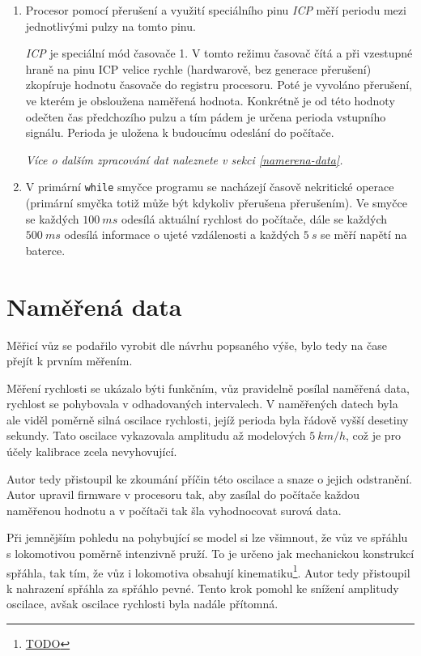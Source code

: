\begin{enumerate}
\item Procesor pomocí přerušení a využití speciálního pinu \textit{ICP}
měří periodu mezi jednotlivými pulzy na tomto pinu.

\textit{ICP} je speciální mód časovače 1. V tomto režimu časovač čítá a při
vzestupné hraně na pinu ICP velice rychle (hardwarově, bez generace přerušení)
zkopíruje hodnotu časovače do registru procesoru. Poté je vyvoláno přerušení,
ve kterém je obsloužena naměřená hodnota. Konkrétně je od této hodnoty odečten
čas předchozího pulzu a tím pádem je určena perioda vstupního signálu. Perioda
je uložena k budoucímu odeslání do počítače.

\textit{Více o dalším zpracování dat naleznete v sekci \ref{namerena-data}.}

\item V primární \texttt{while} smyčce programu se nacházejí časově nekritické
operace (primární smyčka totiž může být kdykoliv přerušena přerušením). Ve
smyčce se každých $100\ ms$ odesílá aktuální rychlost do počítače, dále se každých
$500\ ms$ odesílá informace o ujeté vzdálenosti a každých $5\ s$ se měří napětí
na baterce.

\end{enumerate}

\section{Naměřená data}

Měřicí vůz se podařilo vyrobit dle návrhu popsaného výše, bylo tedy na čase
přejít k prvním měřením.

Měření rychlosti se ukázalo býti funkčním, vůz pravidelně posílal naměřená
data, rychlost se pohybovala v odhadovaných intervalech. V naměřených datech
byla ale viděl poměrně silná oscilace rychlosti, jejíž perioda byla řádově
vyšší desetiny sekundy. Tato oscilace vykazovala amplitudu až modelových
$5\ km/h$, což je pro účely kalibrace zcela nevyhovující.

Autor tedy přistoupil ke zkoumání příčin této oscilace a snaze o jejich
odstranění. Autor upravil firmware v procesoru tak, aby zasílal do počítače
každou naměřenou hodnotu a v počítači tak šla vyhodnocovat surová data.

Při jemnějším pohledu na pohybující se model si lze všimnout, že vůz ve spřáhlu
s lokomotivou poměrně intenzivně pruží. To je určeno jak mechanickou konstrukcí
spřáhla, tak tím, že vůz i lokomotiva obsahují kinematiku\footnote{\url{TODO}}.
Autor tedy přistoupil k nahrazení spřáhla za spřáhlo pevné. Tento krok pomohl
ke snížení amplitudy oscilace, avšak oscilace rychlosti byla nadále přítomná.

